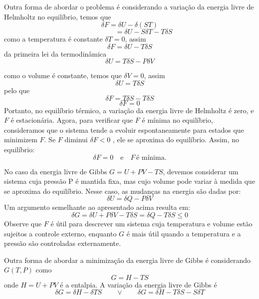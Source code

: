 \documentclass[12pt]{article}
\begin{document}
\begin{itemize}
     Outra forma de abordar o problema é considerando a variação da energia livre de Helmholtz no equilíbrio, temos que
     \[
         \delta F = \delta U - \delta (S T)  
     \]
     \[
       \quad \quad \quad \quad = \delta U - S \delta T - T \delta S
     \]
    como a temperatura é constante $\delta T = 0$, assim
    \[
         \delta F = \delta U - T \delta S  
     \]
     da primeira lei da termodinâmica
     \begin{equation}
         \delta U = T \delta S - P \delta V
     \end{equation}

     como o volume é constante, temos que $\delta V = 0$, assim
     \[
     \delta U = T \delta S 
     \]
     pelo que 
     \[
     \delta F = T \delta S - T \delta S
     \]
     \[
      \delta F = 0
     \]
     Portanto, no equilíbrio térmico, a variação da energia livre de Helmholtz é zero, e  $F$ é estacionária. Agora, para verificar que  $F$ é mínima no equilíbrio, consideramos que o sistema tende a evoluir espontaneamente para estados que minimizem  $F$. Se $F$  diminui $\delta F < 0$ , ele se aproxima do equilíbrio. Assim, no equilíbrio:
     \[
     \delta F = 0 \quad \text{e} \quad F \, \text{é mínima}.
     \]

     No caso da energia livre de Gibbs $G = U + PV - TS$, devemos considerar um sistema cuja pressão P é mantida fixa, mas cujo volume pode variar à medida que se aproxima do equilíbrio. Nesse caso, as mudanças na energia são dadas por:
     \begin{equation}
         \delta U = \delta Q - P \delta V
     \end{equation}
     Um argumento semelhante ao apresentado acima resulta em:
     \begin{equation}
         \delta G = \delta U + P \delta V - T \delta S = \delta Q - T \delta S \leq 0
     \end{equation}
     Observe que $F$ é útil para descrever um sistema cuja temperatura e volume estão sujeitos a controle externo, enquanto $G$ é mais útil quando a temperatura e a pressão são controladas externamente.

     Outra forma de abordar a minimização da energia livre de Gibbs é considerando $G(T,P)$ como
     \[
     G = H - T S
     \]
    onde $H = U + P V$ é a entalpia.
    A variação da energia livre de Gibbs é
    \[
    \delta G = \delta H - \delta TS \quad \quad \vee \quad \quad \delta G =  \delta H - T \delta S - S \delta T
    \]
    

\end{itemize}
\end{document}
